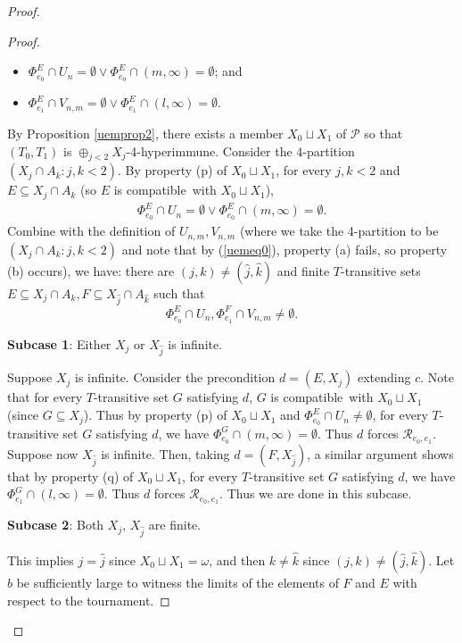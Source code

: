 \documentclass{amsart}
\theoremstyle{definition}
\theoremstyle{remark}
\numberwithin{equation}{section}
\theoremstyle{noparens}
\def\mcal{\mathcal}
\def\iatfshyp{4-hyperimmune}
\def\compatible{compatible}
\def\h{\hat}
\begin{document}
\begin{proof}
\begin{proof}
\begin{itemize}
  \item[(p)]  $\Phi_{e_0}^E\cap U_n=\emptyset\vee \Phi_{e_0}^E\cap(  m,\infty)=\emptyset$; and

  \item[(q)]
  $\Phi_{e_1}^E\cap V_{n,m}=\emptyset\vee \Phi_{e_1}^E\cap (  l,\infty)=\emptyset$.
  \end{itemize}

By Proposition \ref{uemprop2},
there exists a member  $X_0\sqcup X_1$ of $\mcal{P}$
so that $(T_0,T_1)$ is $\oplus_{j<2} X_j$-\iatfshyp.
Consider the $4$-partition $(X_j\cap A_k:j,k<2)$.
By property (p) of $X_0\sqcup X_1$,
for every $j,k<2$ and $E\subseteq X_j\cap A_k$
(so $E$ is \compatible\ with $X_0\sqcup X_1$),
\begin{align}\label{uemeq0}
\Phi_{e_0}^E\cap U_n=\emptyset\vee \Phi_{e_0}^E\cap(  m,\infty)=\emptyset.
\end{align}
Combine with
the  definition of $U_{n,m},V_{n,m}$ (where we take the 4-partition to be $(X_j\cap A_k:j,k<2)$
and note that by (\ref{uemeq0}), property (a)   fails, so property (b) occurs),
we have: there are $(j,k)\ne (\h j,\h k)$ and finite $T$-transitive sets
$E\subseteq X_j\cap A_k, F\subseteq X_{\h j}\cap A_{\h k} $
such that
$$\Phi_{e_0}^E\cap U_n,
\Phi_{e_1}^{F}\cap V_{n,m}\ne\emptyset.$$

\noindent\textbf{Subcase 1}:
Either $X_j$ or $X_{\h j}$ is infinite.

Suppose $X_j$ is infinite.
Consider the precondition $d=(E,X_j)$ extending $c$.
Note that for every $T$-transitive set $G $ satisfying $d$,
$ G$ is \compatible\ with $X_0\sqcup X_1$ (since $G\subseteq X_j$).
 Thus by property (p) of $X_0\sqcup X_1$   and $\Phi_{e_0}^E\cap U_n\ne\emptyset$,
for every  $T$-transitive set $G $  satisfying $d$,
we have $\Phi_{e_0}^G\cap (m,\infty)=\emptyset$.
Thus $d$
forces
$\mcal{R}_{e_0,e_1}$. Suppose now $X_{\h j}$ is infinite. Then, taking $d = (F, X_{\h j})$, a similar argument shows that by property (q) of $X_0\sqcup X_1$, for every  $T$-transitive set $G $  satisfying $d$,
we have $\Phi_{e_1}^G\cap (l,\infty)=\emptyset$.
Thus $d$
forces
$\mcal{R}_{e_0,e_1}$. Thus we are done in this subcase.
\bigskip

\noindent\textbf{Subcase 2}:
Both  $X_j$, $X_{\h j}$ are finite.

This implies $j=\h j$ since $X_0 \sqcup X_1 = \omega$, and then $k\ne \h k$ since $(j,k)\ne (\h j,\h k)$.
Let $b$ be sufficiently large to witness the limits of the elements of $F$ and $E$ with respect to the tournament.


\end{proof}
\end{proof}
\end{document}
